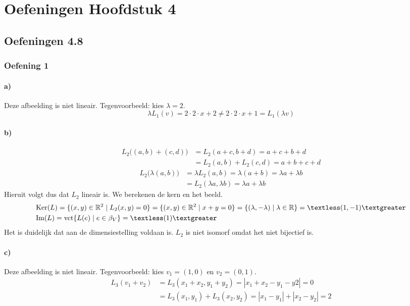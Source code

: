 \documentclass[lineaire_algebra_oplossingen.tex]{subfiles}
\begin{document}
\chapter{Oefeningen Hoofdstuk 4}
\section{Oefeningen 4.8}
\subsection{Oefening 1}
\subsubsection*{a)}
Deze afbeelding is niet lineair. Tegenvoorbeeld: kies $\lambda = 2$.
\[
\lambda L_1(v) = 2 \cdot 2 \cdot x + 2 \neq 2 \cdot 2 \cdot x + 1 = L_1(\lambda v)
\]

\subsubsection*{b)}
\begin{align*}
L_2 \big((a,b)+(c,d)\big)
&= L_2 (a+c,b+d) = a+c+b+d \\
&= L_2(a,b) + L_2(c,d) = a+b+c+d
\end{align*}
\begin{align*}
L_2 \big(\lambda(a,b)\big)
&= \lambda L_2(a,b) = \lambda(a+b) = \lambda a + \lambda b \\
&= L_2(\lambda a, \lambda b) = \lambda a + \lambda b
\end{align*}
Hieruit volgt dus dat $L_2$ lineair is. We berekenen de kern en het beeld.
\begin{align*}
&\text{Ker}(L) = \{(x,y) \in \mathbb{R}^2 \mid L_2(x,y)=0 \} = \{(x,y) \in \mathbb{R}^2 \mid x+y=0 \} = \{(\lambda,-\lambda) \mid \lambda \in \mathbb{R} \} = \textless(1,-1)\textgreater \\
&\text{Im}(L) = \text{vct}\{L(e) \mid e \in \beta_V \} = \textless(1)\textgreater
\end{align*}
Het is duidelijk dat aan de dimensiestelling voldaan is. $L_2$ is niet isomorf omdat het niet bijectief is.

\subsubsection*{c)}
Deze afbeelding is niet lineair. Tegenvoorbeeld: kies $v_1 = (1,0)$ en $v_2=(0,1)$.
\begin{align*}
L_3(v_1+v_2)
&= L_3(x_1+x_2,y_1+y_2) = |x_1+x_2-y_1-y2| = 0 \\
&= L_3(x_1,y_1) + L_3(x_2,y_2) = |x_1-y_1| + |x_2-y_2| = 2
\end{align*}
\end{document}
